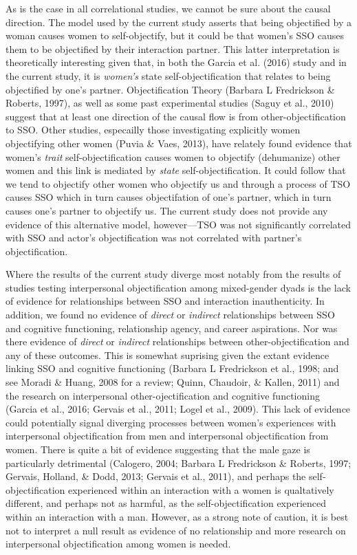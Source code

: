 \documentclass[man]{apa6}
\begin{document}
As is the case in all correlational studies, we cannot be sure about the
causal direction. The model used by the current study asserts that being
objectified by a woman causes women to self-objectify, but it could be
that women's SSO causes them to be objectified by their interaction
partner. This latter interpretation is theoretically interesting given
that, in both the Garcia et al. (2016) study and in the current study,
it is \emph{women's} state self-objectification that relates to being
objectified by one's partner. Objectification Theory (Barbara L
Fredrickson \& Roberts, 1997), as well as some past experimental studies
(Saguy et al., 2010) suggest that at least one direction of the causal
flow is from other-objectification to SSO. Other studies, especailly
those investigating explicitly women objectifying other women (Puvia \&
Vaes, 2013), have relately found evidence that women's \emph{trait}
self-objectification causes women to objectify (dehumanize) other women
and this link is mediated by \emph{state} self-objectification. It could
follow that we tend to objectify other women who objectify us and
through a process of TSO causes SSO which in turn causes objectifation
of one's partner, which in turn causes one's partner to objectify us.
The current study does not provide any evidence of this alternative
model, however---TSO was not significantly correlated with SSO and
actor's objectification was not correlated with partner's
objectification.

Where the results of the current study diverge most notably from the
results of studies testing interpersonal objectification among
mixed-gender dyads is the lack of evidence for relationships between SSO
and interaction inauthenticity. In addition, we found no evidence of
\emph{direct} or \emph{indirect} relationships between SSO and cognitive
functioning, relationship agency, and career aspirations. Nor was there
evidence of \emph{direct} or \emph{indirect} relationships between
other-objectification and any of these outcomes. This is somewhat
suprising given the extant evidence linking SSO and cognitive
functioning (Barbara L Fredrickson et al., 1998; and see Moradi \&
Huang, 2008 for a review; Quinn, Chaudoir, \& Kallen, 2011) and the
research on interpersonal other-ojectification and cognitive functioning
(Garcia et al., 2016; Gervais et al., 2011; Logel et al., 2009). This
lack of evidence could potentially signal diverging processes between
women's experiences with interpersonal objectification from men and
interpersonal objectification from women. There is quite a bit of
evidence suggesting that the male gaze is particularly detrimental
(Calogero, 2004; Barbara L Fredrickson \& Roberts, 1997; Gervais,
Holland, \& Dodd, 2013; Gervais et al., 2011), and perhaps the
self-objectification experienced within an interaction with a women is
qualtatively different, and perhaps not as harmful, as the
self-objectification experienced within an interaction with a man.
However, as a strong note of caution, it is best not to interpret a null
result as evidence of no relationship and more research on interpersonal
objectification among women is needed.
\end{document}
